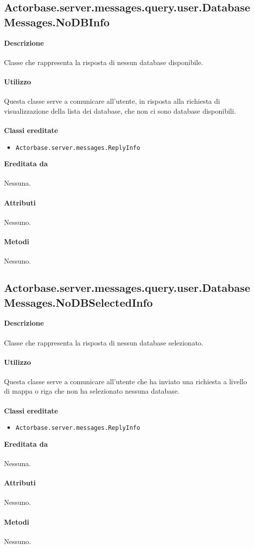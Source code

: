 \documentclass[a4paper]{article}
\begin{document}
	\subsection{Actorbase.server.messages.query.user.DatabaseMessages.NoDBInfo}
		\textbf{Descrizione}
			\\ \\
		Classe che rappresenta la risposta di nessun database disponibile.
			\\ \\
		\textbf{Utilizzo}
			\\ \\
		Questa classe serve a comunicare all'utente, in risposta alla richiesta di visualizzazione della lista dei database, che non ci sono database disponibili.
			\\ \\
		\textbf{Classi ereditate}
			\begin{itemize}
				\item \texttt{Actorbase.server.messages.ReplyInfo }
			\end{itemize}
		\textbf{Ereditata da}
			\\ \\
			Nessuna.
			\\ \\
		\textbf{Attributi}
			\\ \\
			Nessuno.
			\\ \\
		\textbf{Metodi }
			\\ \\
			Nessuno.
			
	\subsection{Actorbase.server.messages.query.user.DatabaseMessages.NoDBSelectedInfo}
		\textbf{Descrizione}
			\\ \\
		Classe che rappresenta la risposta di nessun database selezionato.
			\\ \\
		\textbf{Utilizzo}
			\\ \\
		Questa classe serve a comunicare all'utente che ha inviato una richiesta a livello di mappa o riga che non ha selezionato nessuna database.
			\\ \\
		\textbf{Classi ereditate}
			\begin{itemize}
				\item \texttt{Actorbase.server.messages.ReplyInfo }
			\end{itemize}
		\textbf{Ereditata da}
			\\ \\
			Nessuna.
			\\ \\
		\textbf{Attributi}
			\\ \\
			Nessuno.
			\\ \\
		\textbf{Metodi }
			\\ \\
			Nessuno.
			
\end{document}
